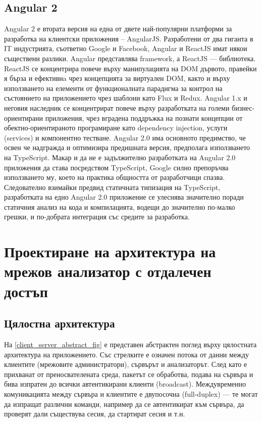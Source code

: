 \documentclass[12pt,a4paper,oneside]{book}
\begin{document}
\subsection{Angular 2}

Angular 2 е втората версия на една от двете най-популярни платформи за
разработка на клиентски приложения -- AngularJS. Разработени от два гиганта в IT
индустрията, съответно Google и Facebook, Angular и ReactJS имат някои
съществени разлики. Angular представлява framework, а ReactJS --- библиотека.
ReactJS се концентрира повече върху манипулацията на DOM дървото,
правейки я бърза и ефективнa чрез концепцията за виртуален DOM, както и върху
използването на елементи от функционалната парадигма за контрол на състоянието
на приложението чрез шаблони като Flux и Redux. Angular 1.x и неговия наследник
се концентрират повече върху разработката на големи бизнес-ориентирани
приложения, чрез вградена поддръжка на познати концепции от
обектно-ориентираното програмиране като dependency injection, услуги (services)
и компонентно тестване. Angular 2.0 има основното предимство, че освен че
надгражда и оптимизира предишната версия, предполага използването на TypeScript.
Макар и да не е задължително разработката на Angular 2.0 приложения да става
посредством TypeScript, Google силно препоръчва използването му, което на
практика общността от разработчици спазва. Следователно взимайки предвид
статичната типизация на TypeScript, разработката на едно Angular 2.0 приложение
се улеснява значително поради статичния анализ на кода и компилацията, водещи до
значително по-малко грешки, и по-добрата интеграция със средите за разработка.

\section{Проектиране на архитектура на мрежов анализатор с отдалечен достъп}

\subsection{Цялостна архитектура}

На \autoref{client_server_abstract_fig} е представен абстрактен поглед върху
цялостната архитектура на приложението. Със стрелките е означен потока от
данни между клиентите (мрежовите администратори), сървърът и анализаторът. След
като е прихванат от преносвателената среда, пакетът се обработва, подава на
сървъра и бива изпратен до всички автентикирани клиенти (broadcast).
Междувременно комуникацията между сървъра и клиентите е двупосочна (full-duplex)
--- те могат да изпращат различни команди, например да се автентикират към сървъра,
да проверят дали съществува сесия, да стартират сесия и т.н.
\end{document}
